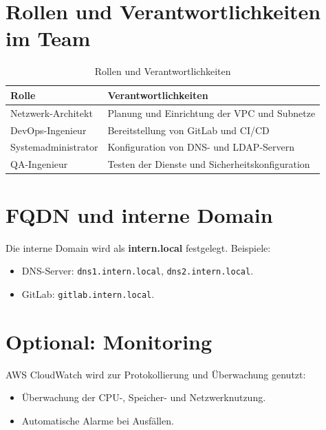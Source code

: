 \documentclass[a4paper,12pt]{article}
\begin{document}
\section{Rollen und Verantwortlichkeiten im Team}
\begin{table}[h!]
    \centering
    \begin{tabular}{|l|l|}
    \hline
    \textbf{Rolle}            & \textbf{Verantwortlichkeiten}               \\ \hline
    Netzwerk-Architekt        & Planung und Einrichtung der VPC und Subnetze \\ \hline
    DevOps-Ingenieur          & Bereitstellung von GitLab und CI/CD         \\ \hline
    Systemadministrator       & Konfiguration von DNS- und LDAP-Servern     \\ \hline
    QA-Ingenieur              & Testen der Dienste und Sicherheitskonfiguration \\ \hline
    \end{tabular}
    \caption{Rollen und Verantwortlichkeiten}
\end{table}

\section{FQDN und interne Domain}
Die interne Domain wird als \textbf{intern.local} festgelegt. Beispiele:
\begin{itemize}
    \item DNS-Server: \texttt{dns1.intern.local}, \texttt{dns2.intern.local}.
    \item GitLab: \texttt{gitlab.intern.local}.
\end{itemize}

\section*{Optional: Monitoring}
AWS CloudWatch wird zur Protokollierung und Überwachung genutzt:
\begin{itemize}
    \item Überwachung der CPU-, Speicher- und Netzwerknutzung.
    \item Automatische Alarme bei Ausfällen.
\end{itemize}
\end{document}
